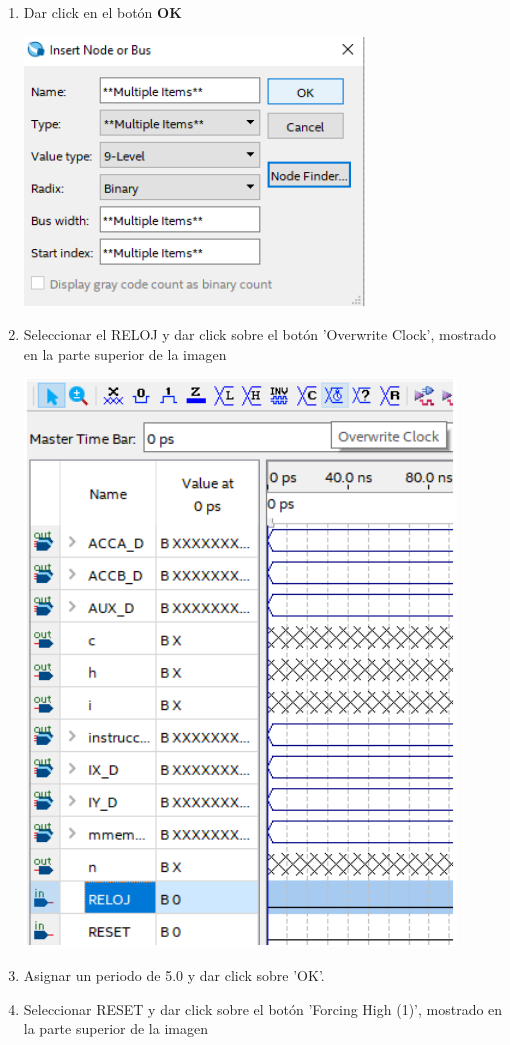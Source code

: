 \documentclass{IEEEtran}
\begin{document}
\begin{enumerate}
\item Dar click en el botón \textbf{OK}
\begin{center}
\includegraphics[width=0.6\linewidth]{./img/sim5.png}
\end{center}
\item Seleccionar el RELOJ y dar click sobre el botón 'Overwrite Clock', mostrado en la parte superior de la imagen
\begin{center}
\includegraphics[width=0.6\linewidth]{./img/sim6.png}
\end{center}
\item Asignar un periodo de 5.0 y dar click sobre 'OK'.
\item Seleccionar RESET y dar click sobre el botón 'Forcing High (1)', mostrado en la parte superior de la imagen
\begin{center}

\end{center}
\end{enumerate}
\end{document}
